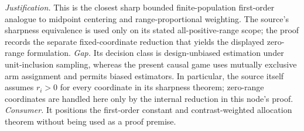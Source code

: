\documentclass{article}
\begin{document}
\par\smallskip\noindent \textit{Justification.} This is the closest sharp bounded finite-population first-order analogue to midpoint centering and range-proportional weighting.  The source's sharpness equivalence is used only on its stated all-positive-range scope; the proof records the separate fixed-coordinate reduction that yields the displayed zero-range formulation. \textit{Gap.} Its decision class is design-unbiased estimation under unit-inclusion sampling, whereas the present causal game uses mutually exclusive arm assignment and permits biased estimators.  In particular, the source itself assumes \(r_i>0\) for every coordinate in its sharpness theorem; zero-range coordinates are handled here only by the internal reduction in this node's proof. \textit{Consumer.} It positions the first-order constant and contrast-weighted allocation theorem without being used as a proof premise.
\end{document}
